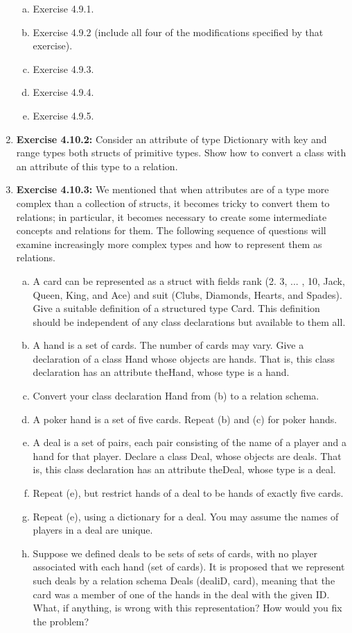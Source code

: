 \documentclass[12pt]{article}
\begin{document}
\begin{enumerate}[1.]
    \begin{enumerate}[a)]
        \item Exercise 4.9.1.
        \item Exercise 4.9.2 (include all four of the modifications specified by that exercise).
        \item Exercise 4.9.3.
        \item Exercise 4.9.4.
        \item Exercise 4.9.5.
    \end{enumerate}
    \item \textbf{Exercise 4.10.2:} Consider an attribute of type Dictionary with key and range types both structs of primitive types. Show how to convert a class with an attribute of this type to a relation.
    \item \textbf{Exercise 4.10.3:} We mentioned that when attributes are of a type more complex than a collection of structs, it becomes tricky to convert them to relations; in particular, it becomes necessary to create some intermediate concepts and relations for them. The following sequence of questions will examine increasingly more complex types and how to represent them as relations.

    \begin{enumerate}[a)]
        \item A card can be represented as a struct with fields rank (2. 3, ... , 10, Jack, Queen, King, and Ace) and suit (Clubs, Diamonds, Hearts, and Spades). Give a suitable definition of a structured type Card. This definition should be independent of any class declarations but available to them all.
        \item A hand is a set of cards. The number of cards may vary. Give a declaration of a class Hand whose objects are hands. That is, this class declaration has an attribute theHand, whose type is a hand.
        \item Convert your class declaration Hand from (b) to a relation schema.
        \item A poker hand is a set of five cards. Repeat (b) and (c) for poker hands.
        \item A deal is a set of pairs, each pair consisting of the name of a player and a hand for that player. Declare a class Deal, whose objects are deals. That is, this class declaration has an attribute theDeal, whose type is a deal.
        \item Repeat (e), but restrict hands of a deal to be hands of exactly five cards.
        \item Repeat (e), using a dictionary for a deal. You may assume the names of players in a deal are unique.
        \item Suppose we defined deals to be sets of sets of cards, with no player associated with each hand (set of cards). It is proposed that we represent such deals by a relation schema Deals (dealiD, card), meaning that the card was a member of one of the hands in the deal with the given ID. What, if anything, is wrong with this representation? How would you fix the problem?
    \end{enumerate}
\end{enumerate}
\end{document}
